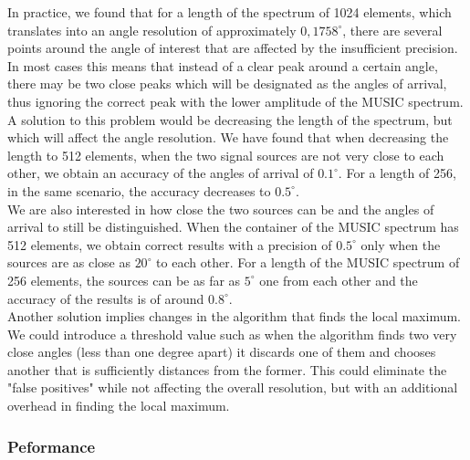 In practice, we found that for a length of the spectrum of 1024 elements, which
translates into an angle resolution of approximately $0,1758^{\circ}$, there are
several points around the angle of interest that are affected by the
insufficient precision. In most cases this means that instead of a clear peak
around a certain angle, there may be two close peaks which will be designated as
the angles of arrival, thus ignoring the correct peak with the lower amplitude
of the MUSIC spectrum. \\


A solution to this problem would be decreasing the length of the spectrum, but
which will affect the angle resolution. We have found that when decreasing the
length to 512 elements, when the two signal sources are not very close to each
other, we obtain an accuracy of the angles of arrival of $0.1^{\circ}$. For a
length of 256, in the same scenario, the accuracy decreases to $0.5^{\circ}$. \\

We are also interested in how close the two sources can be and the angles of
arrival to still be distinguished. When the container of the MUSIC spectrum has
512 elements, we obtain correct results with a precision of $0.5^{\circ}$ only
when the sources are as close as $20^{\circ}$ to each other. For a length of the
MUSIC spectrum of 256 elements, the sources can be as far as $5^{\circ}$ one from
each other and the accuracy of the results is of around $0.8^{\circ}$. \\

Another solution implies changes in the algorithm that finds the local maximum.
We could introduce a threshold value such as when the algorithm finds two very
close angles (less than one degree apart) it discards one of them and chooses
another that is sufficiently distances from the former. This could eliminate the
"false positives" while not affecting the overall resolution, but with an
additional overhead in finding the local maximum.

\subsubsection{Peformance}
